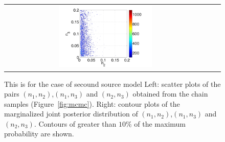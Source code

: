 \begin{figure}[ht]
\begin{tabular}{clc}
\includegraphics[width=0.475\textwidth]{./figures/2jpdf23.pdf}
        \end{tabular}
\caption{\alert{This is for the case of secound source model} Left: scatter plots of the pairs $(n_1,n_2)$,$(n_1,n_3)$ and $(n_2,n_3)$ obtained from the
chain samples (Figure~\ref{fig:mcmc}). 
Right: contour plots of the marginalized joint posterior distribution of $(n_1,n_2)$,$(n_1,n_3)$ and $(n_2,n_3)$.  Contours of greater than $10\%$ of the maximum probability are shown.}
\label{fig:joint} 
        \end{figure}